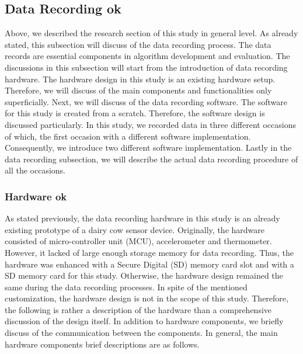 \documentclass[english,12pt,a4paper,pdftex,elec,utf8]{aaltothesis}
\begin{document}
\subsection{Data Recording ok} \label{datarecordingsection}

Above, we described the research section of this study in general level. As already stated, this subsection will discuss of the data recording process. The data records are essential components in algorithm development and evaluation. The discussions in this subsection will start from the introduction of data recording hardware. The hardware design in this study is an existing hardware setup. Therefore, we will discuss of the main components and functionalities only superficially. Next, we will discuss of the data recording software. The software for this study is created from a scratch. Therefore, the software design is discussed particularly. In this study, we recorded data in three different occasions of which, the first occasion with a different software implementation. Consequently, we introduce two different software implementation.  Lastly in the data recording subsection, we will describe the actual data recording procedure of all the occasions.

\subsubsection{Hardware ok} \label{hardwaresection}

As stated previously, the data recording hardware in this study is an already existing prototype of a dairy cow sensor device. Originally, the hardware consisted of micro-controller unit (MCU), accelerometer and thermometer. However, it lacked of large enough storage memory for data recording. Thus, the hardware was enhanced with a Secure Digital (SD) memory card slot and with a SD memory card for this study. Otherwise, the hardware design remained the same during the data recording processes. In spite of the mentioned customization, the hardware design is not in the scope of this study. Therefore, the following is rather a description of the hardware than a comprehensive discussion of the design itself. In addition to hardware components, we briefly discuss of the communication between the components. In general, the main hardware components brief descriptions are as follows.
\end{document}
